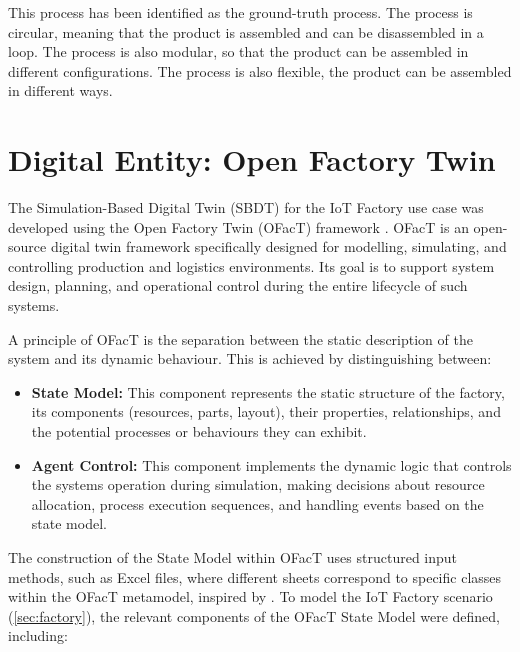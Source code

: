 This process has been identified as the ground-truth process. The process is circular, meaning that the product is assembled and can be disassembled in a loop. The process is also modular, so that the product can be assembled in different configurations. The process is also flexible, the product can be assembled in different ways.

\section{Digital Entity: Open Factory Twin}
\label{sec:automated-digital-twin}

The Simulation-Based Digital Twin (SBDT) for the IoT Factory use case was developed using the Open Factory Twin (OFacT) framework \autocite{ofact-intern}. OFacT is an open-source digital twin framework specifically designed for modelling, simulating, and controlling production and logistics environments. Its goal is to support system design, planning, and operational control during the entire lifecycle of such systems.

A principle of OFacT is the separation between the static description of the system and its dynamic behaviour. This is achieved by distinguishing between:

\begin{itemize}
  \item \textbf{State Model:} This component represents the static structure of the factory, its components (resources, parts, layout), their properties, relationships, and the potential processes or behaviours they can exhibit.
  \item \textbf{Agent Control:} This component implements the dynamic logic that controls the systems operation during simulation, making decisions about resource allocation, process execution sequences, and handling events based on the state model.
\end{itemize}

The construction of the State Model within OFacT uses structured input methods, such as Excel files, where different sheets correspond to specific classes within the OFacT metamodel, inspired by \textcite{schwede2024learning}. To model the IoT Factory scenario (\autoref{sec:factory}), the relevant components of the OFacT State Model were defined, including:


